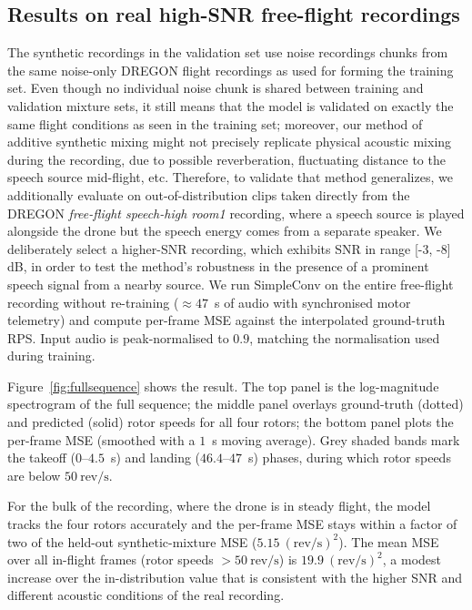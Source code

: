 \documentclass{QD_2026}
\newcommand{\revps}{\mathrm{rev}/\mathrm{s}}
\begin{document}
\subsection{Results on real high-SNR free-flight recordings}
\label{sec:highsnr}

The synthetic recordings in the validation set use noise recordings chunks from the same noise-only DREGON flight recordings as used for forming the training set. Even though no individual noise chunk is shared between training and validation mixture sets, it still means that the model is validated on exactly the same flight conditions as seen in the training set; moreover, our method of additive synthetic mixing might not precisely replicate physical acoustic mixing during the recording, due to possible reverberation, fluctuating distance to the speech source mid-flight, etc. Therefore, to validate that method generalizes, we additionally evaluate on out-of-distribution clips taken directly
from the DREGON \emph{free-flight speech-high room1} recording, where a
speech source is played alongside the drone but the speech energy comes from a
separate speaker. We deliberately select a higher-SNR recording, which exhibits SNR in range [-3, -8] dB, in order to test the method's robustness in the presence of a prominent speech signal from a nearby source.
We run SimpleConv on the entire free-flight recording without re-training
($\approx 47$~s of audio with synchronised motor telemetry) and compute
per-frame MSE against the interpolated ground-truth RPS.
Input audio is peak-normalised to $0.9$, matching the normalisation used during
training.

Figure~\ref{fig:fullsequence} shows the result.
The top panel is the log-magnitude spectrogram of the full sequence; the
middle panel overlays ground-truth (dotted) and predicted (solid) rotor speeds
for all four rotors; the bottom panel plots the per-frame MSE (smoothed with a
$1$~s moving average).
Grey shaded bands mark the takeoff ($0$--$4.5$~s) and landing
($46.4$--$47$~s) phases, during which rotor speeds are below $50~\revps$.

For the bulk of the recording, where the drone is in steady flight, the
model tracks the four rotors accurately and the per-frame MSE stays within a
factor of two of the held-out synthetic-mixture MSE ($5.15~(\revps)^{2}$).
The mean MSE over all in-flight frames (rotor speeds $> 50~\revps$) is
$19.9~(\revps)^{2}$, a modest increase over the in-distribution value that
is consistent with the higher SNR and different acoustic conditions of the
real recording.
\end{document}
